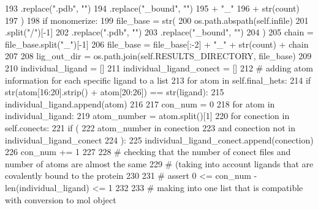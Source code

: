 \begin{DoxyCode}
193                                 .replace(\textcolor{stringliteral}{".pdb"}, \textcolor{stringliteral}{""})
194                                 .replace(\textcolor{stringliteral}{"\_bound"}, \textcolor{stringliteral}{""})
195                                 + \textcolor{stringliteral}{"\_"}
196                                 + str(count)
197                             )
198             \textcolor{keywordflow}{if} monomerize:
199                 file\_base = str(
200                                 os.path.abspath(self.infile)
201                                 .split(\textcolor{stringliteral}{"/"})[-1]
202                                 .replace(\textcolor{stringliteral}{".pdb"}, \textcolor{stringliteral}{""})
203                                 .replace(\textcolor{stringliteral}{"\_bound"}, \textcolor{stringliteral}{""})
204                             )
205                 chain = file\_base.split(\textcolor{stringliteral}{"\_"})[-1]
206                 file\_base = file\_base[:-2] + \textcolor{stringliteral}{"\_"} + str(count) + chain
207 
208         lig\_out\_dir = os.path.join(self.RESULTS\_DIRECTORY, file\_base)
209 
210         individual\_ligand = []
211         individual\_ligand\_conect = []
212         \textcolor{comment}{# adding atom information for each specific ligand to a list}
213         \textcolor{keywordflow}{for} atom \textcolor{keywordflow}{in} self.final\_hets:
214             \textcolor{keywordflow}{if} str(atom[16:20].strip() + atom[20:26]) == str(ligand):
215                 individual\_ligand.append(atom)
216 
217         con\_num = 0
218         \textcolor{keywordflow}{for} atom \textcolor{keywordflow}{in} individual\_ligand:
219             atom\_number = atom.split()[1]
220             \textcolor{keywordflow}{for} conection \textcolor{keywordflow}{in} self.conects:
221                 \textcolor{keywordflow}{if} (
222                     atom\_number \textcolor{keywordflow}{in} conection
223                     \textcolor{keywordflow}{and} conection \textcolor{keywordflow}{not} \textcolor{keywordflow}{in} individual\_ligand\_conect
224                 ):
225                     individual\_ligand\_conect.append(conection)
226                     con\_num += 1
227 
228         \textcolor{comment}{# checking that the number of conect files and number of atoms are almost the same}
229         \textcolor{comment}{# (taking into account ligands that are covalently bound to the protein}
230 
231         \textcolor{comment}{# assert 0 <= con\_num - len(individual\_ligand) <= 1}
232 
233         \textcolor{comment}{# making into one list that is compatible with conversion to mol object}

\end{DoxyCode}
